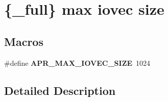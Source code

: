 \hypertarget{group__apr__file__writev}{}\section{\{\+\_\+full\} max iovec size}
\label{group__apr__file__writev}
\subsection*{Macros}
\begin{DoxyCompactItemize}
\item 
\mbox{\label{group__apr__file__writev_gae04a4721139b2b252ea20e68883da4b4}} 
\#define {\bfseries A\+P\+R\+\_\+\+M\+A\+X\+\_\+\+I\+O\+V\+E\+C\+\_\+\+S\+I\+ZE}~1024
\end{DoxyCompactItemize}


\subsection{Detailed Description}
